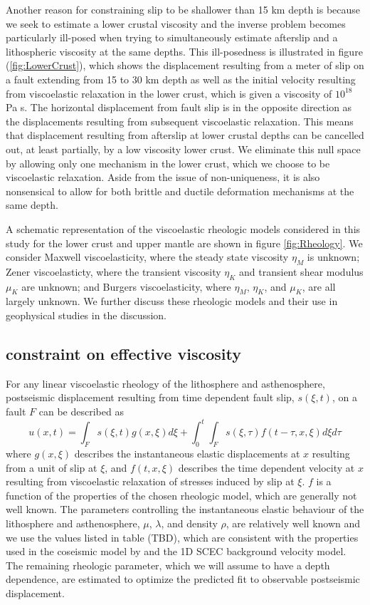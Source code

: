 \documentclass[12pt]{article}
\begin{document}
Another reason for constraining slip to be shallower than 15 km depth is because we seek to estimate a lower crustal viscosity and the inverse problem becomes particularly ill-posed when trying to simultaneously estimate afterslip and a lithospheric viscosity at the same depths. 
This ill-posedness is illustrated in figure (\ref{fig:LowerCrust}), which shows the displacement resulting from a meter of slip on a fault extending from 15 to 30 km depth as well as the initial velocity resulting from viscoelastic relaxation in the lower crust, which is given a viscosity of $10^{18}$ Pa s.  The horizontal displacement from fault slip is in the opposite direction as the displacements resulting from subsequent viscoelastic relaxation.  This means that displacement resulting from afterslip at lower crustal depths can be cancelled out, at least partially, by a low viscosity lower crust.  We eliminate this null space by allowing only one mechanism in the lower crust, which we choose to be viscoelastic relaxation.  Aside from the issue of non-uniqueness, it is also nonsensical to allow for both brittle and ductile deformation mechanisms at the same depth. 

A schematic representation of the viscoelastic rheologic models considered in this study for the lower crust and upper mantle are shown in figure \ref{fig:Rheology}.  We consider Maxwell viscoelasticity, where the steady state viscosity $\eta_M$ is unknown; Zener viscoelasticty, where the transient viscosity $\eta_K$ and transient shear modulus $\mu_K$ are unknown; and Burgers viscoelasticity, where $\eta_M$, $\eta_K$, and $\mu_K$, are all largely unknown. We further discuss these rheologic models and their use in geophysical studies in the discussion. 

\subsection*{constraint on effective viscosity}\label{InitialInversion}
For any linear viscoelastic rheology of the lithosphere and asthenosphere, postseismic displacement resulting from time dependent fault slip, $s(\xi,t)$, on a fault $F$ can be described as  
\begin{equation}\label{GeneralForward}
  u(x,t) = \int_F s(\xi,t)g(x,\xi)d\xi + 
           \int_0^t\int_F s(\xi,\tau) f(t-\tau,x,\xi) d\xi d\tau
\end{equation}
where $g(x,\xi)$ describes the instantaneous elastic displacements at $x$ resulting from a unit of slip at $\xi$, and $f(t,x,\xi)$ describes the time dependent velocity at $x$ resulting from viscoelastic relaxation of stresses induced by slip at $\xi$. $f$ is a function of the properties of the chosen rheologic model, which are generally not well known.  The parameters controlling the instantaneous elastic behaviour of the lithosphere and asthenosphere, $\mu$, $\lambda$, and density $\rho$, are relatively well known and we use the values listed in table (TBD), which are consistent with the properties used in the coseismic model by \cite{Wei2011} and the 1D SCEC background velocity model.  The remaining rheologic parameter, which we will assume to have a depth dependence, are estimated to optimize the predicted fit to observable postseismic displacement.
\end{document}
